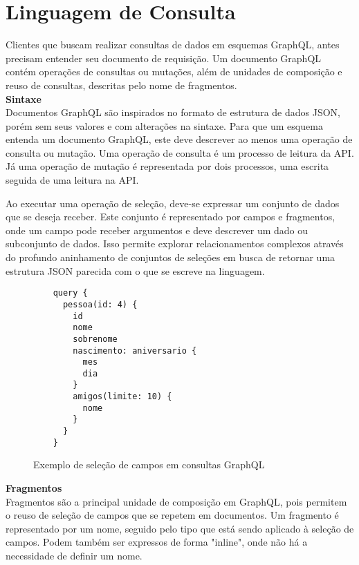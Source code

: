 \section[Linguagem de Consulta]{Linguagem de Consulta}

Clientes que buscam realizar consultas de dados em esquemas GraphQL, antes precisam entender seu documento de requisição. Um documento GraphQL contém operações de consultas ou mutações, além de unidades de composição e reuso de consultas, descritas pelo nome de fragmentos. \cite{GraphQL2016} \\

\textbf{Sintaxe} \\

Documentos GraphQL são inspirados no formato de estrutura de dados JSON, porém sem seus valores e com alterações na sintaxe. Para que um esquema entenda um documento GraphQL, este deve descrever ao menos uma operação de consulta ou mutação. Uma operação de consulta é um processo de leitura da API. Já uma operação de mutação é representada por dois processos, uma escrita seguida de uma leitura na API.

Ao executar uma operação de seleção, deve-se expressar um conjunto de dados que se deseja receber. Este conjunto é representado por campos e fragmentos, onde um campo pode receber argumentos e deve descrever um dado ou subconjunto de dados. Isso permite explorar relacionamentos complexos através do profundo aninhamento de conjuntos de seleções em busca de retornar uma estrutura JSON parecida com o que se escreve na linguagem.

\begin{figure}[H]
  \centering
  \begin{verbatim}
    query {
      pessoa(id: 4) {
        id
        nome
        sobrenome
        nascimento: aniversario {
          mes
          dia
        }
        amigos(limite: 10) {
          nome
        }
      }
    }
  \end{verbatim}
  \caption{Exemplo de seleção de campos em consultas GraphQL}
\end{figure}

\textbf{Fragmentos} \\

Fragmentos são a principal unidade de composição em GraphQL, pois permitem o reuso de seleção de campos que se repetem em documentos. Um fragmento é representado por um nome, seguido pelo tipo que está sendo aplicado à seleção de campos. Podem também ser expressos de forma "inline", onde não há a necessidade de definir um nome.


